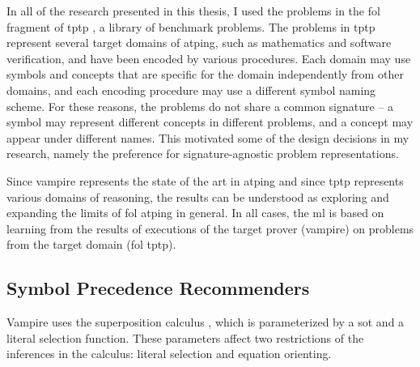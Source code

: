 In all of the research presented in this thesis, I used the problems in the \gls{fol} fragment of \gls{tptp} \cite{Sutcliffe2017}, a library of benchmark problems.
The problems in \gls{tptp} represent several target domains of \gls{atping},
such as mathematics and software verification, and have been encoded by various procedures.
Each domain may use symbols and concepts that are specific for the domain independently from other domains,
and each encoding procedure may use a different symbol naming scheme.
For these reasons, the problems do not share a common \gls{signature} -- a symbol may represent different concepts in different problems, and a concept may appear under different names.
This motivated some of the design decisions in my research, namely the preference for signature-agnostic problem representations.

Since \gls{vampire} represents the state of the art in \gls{atping} \cite{casc-j12,DBLP:journals/aicom/SutcliffeD23}
and since \gls{tptp} represents various domains of reasoning,
the results can be understood as exploring and expanding the limits of \gls{fol} \gls{atping} in general.
In all cases, the \gls{ml} is based on learning from the results of executions of the target prover (\gls{vampire}) on problems from the target domain (\gls{fol} \gls{tptp}).

\subsection{Symbol Precedence Recommenders}
\label{sec:contrib:SymbolPrecedenceRecommenders}

Vampire uses the superposition calculus \cite{DBLP:conf/cav/KovacsV13,DBLP:journals/logcom/BachmairG94},
which is parameterized by a \gls{sot} and a literal selection function.
These parameters affect two restrictions of the inferences in the calculus: literal selection and equation orienting.

